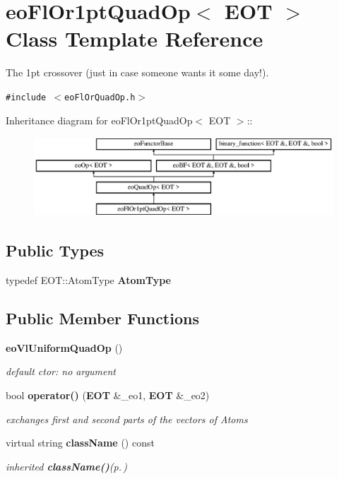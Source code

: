 \section{eo\-Fl\-Or1pt\-Quad\-Op$<$ EOT $>$ Class Template Reference}
\label{classeo_fl_or1pt_quad_op}
The 1pt crossover (just in case someone wants it some day!).  


{\tt \#include $<$eo\-Fl\-Or\-Quad\-Op.h$>$}

Inheritance diagram for eo\-Fl\-Or1pt\-Quad\-Op$<$ EOT $>$::\begin{figure}[H]
\begin{center}
\leavevmode
\includegraphics[height=2.96296cm]{classeo_fl_or1pt_quad_op}
\end{center}
\end{figure}
\subsection*{Public Types}
\begin{CompactItemize}
\item 
typedef EOT::Atom\-Type {\bf Atom\-Type}\label{classeo_fl_or1pt_quad_op_w0}

\end{CompactItemize}
\subsection*{Public Member Functions}
\begin{CompactItemize}
\item 
{\bf eo\-Vl\-Uniform\-Quad\-Op} ()\label{classeo_fl_or1pt_quad_op_a0}

\begin{CompactList}\small\item\em default ctor: no argument \item\end{CompactList}\item 
bool {\bf operator()} ({\bf EOT} \&\_\-eo1, {\bf EOT} \&\_\-eo2)\label{classeo_fl_or1pt_quad_op_a1}

\begin{CompactList}\small\item\em exchanges first and second parts of the vectors of Atoms \item\end{CompactList}\item 
virtual string {\bf class\-Name} () const \label{classeo_fl_or1pt_quad_op_a2}

\begin{CompactList}\small\item\em inherited {\bf class\-Name()}{\rm (p.\,\pageref{classeo_fl_or1pt_quad_op_a2})} \item\end{CompactList}\end{CompactItemize}



